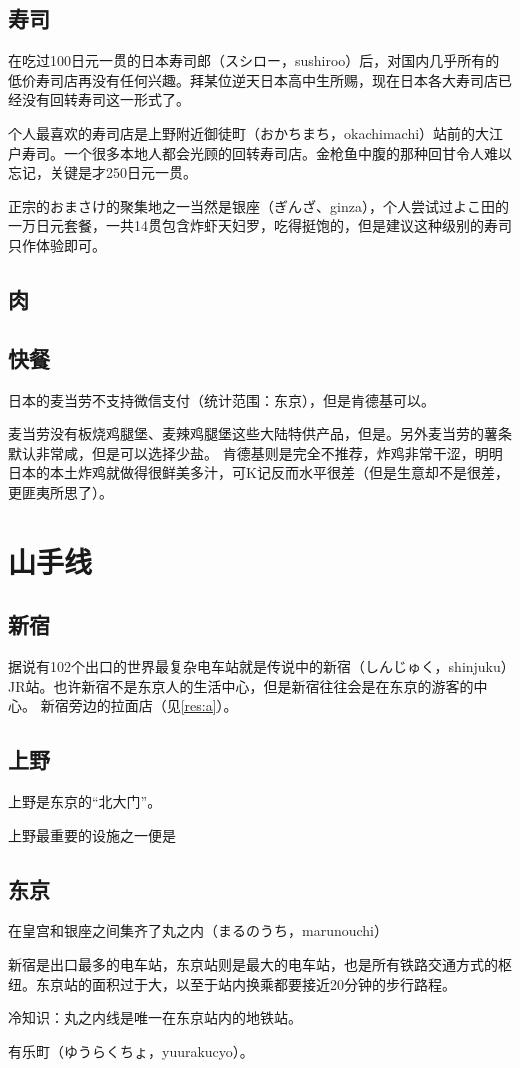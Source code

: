 \documentclass{article}
\begin{document}
\subsection{寿司}
在吃过100日元一贯的日本寿司郎（スシロー，sushiroo）后，对国内几乎所有的低价寿司店再没有任何兴趣。拜某位逆天日本高中生所赐，现在日本各大寿司店已经没有回转寿司这一形式了。\par
个人最喜欢的寿司店是上野附近御徒町（おかちまち，okachimachi）站前的大江户寿司。一个很多本地人都会光顾的回转寿司店。金枪鱼中腹的那种回甘令人难以忘记，关键是才250日元一贯。\par
正宗的おまさけ的聚集地之一当然是银座（ぎんざ、ginza），个人尝试过よこ田的一万日元套餐，一共14贯包含炸虾天妇罗，吃得挺饱的，但是建议这种级别的寿司只作体验即可。

\subsection{肉}

\subsection{快餐}
日本的麦当劳不支持微信支付（统计范围：东京），但是肯德基可以。\par
麦当劳没有板烧鸡腿堡、麦辣鸡腿堡这些大陆特供产品，但是。另外麦当劳的薯条默认非常咸，但是可以选择少盐。
肯德基则是完全不推荐，炸鸡非常干涩，明明日本的本土炸鸡就做得很鲜美多汁，可K记反而水平很差（但是生意却不是很差，更匪夷所思了）。

\section{山手线}
\subsection{新宿}
据说有102个出口的世界最复杂电车站就是传说中的新宿（しんじゅく，shinjuku）JR站。也许新宿不是东京人的生活中心，但是新宿往往会是在东京的游客的中心。
新宿旁边的拉面店（见\ref{res:a}）。


\subsection{上野}
上野是东京的“北大门”。\par
上野最重要的设施之一便是

\subsection{东京}
在皇宫和银座之间集齐了丸之内（まるのうち，marunouchi）\par
新宿是出口最多的电车站，东京站则是最大的电车站，也是所有铁路交通方式的枢纽。东京站的面积过于大，以至于站内换乘都要接近20分钟的步行路程。\par
冷知识：丸之内线是唯一在东京站内的地铁站。\par
有乐町（ゆうらくちょ，yuurakucyo）。
\end{document}
